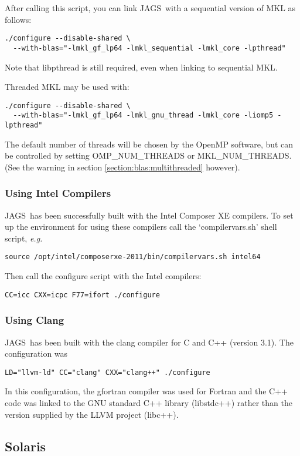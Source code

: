 \documentclass[11pt, a4paper, titlepage]{article}
\newcommand{\JAGS}{\textsf{JAGS}}
\newcommand{\code}[1]{{\bgroup{\normalfont\ttfamily #1}\egroup}}
\newcommand{\file}[1]{{`\normalfont\textsf{#1}'}}
\begin{document}
After calling this script, you can link \JAGS\ with a sequential
version of MKL as follows:
\begin{verbatim}
./configure --disable-shared \
  --with-blas="-lmkl_gf_lp64 -lmkl_sequential -lmkl_core -lpthread"
\end{verbatim}
Note that \code{libpthread} is still required, even when linking
to sequential MKL.

Threaded MKL may be used with:
\begin{verbatim}
./configure --disable-shared \
  --with-blas="-lmkl_gf_lp64 -lmkl_gnu_thread -lmkl_core -liomp5 -lpthread"
\end{verbatim}
The default number of threads will be chosen by the OpenMP software,
but can be controlled by setting \code{OMP\_NUM\_THREADS} or
\code{MKL\_NUM\_THREADS}.  (See the warning in section
\ref{section:blas:multithreaded} however).

\subsubsection{Using Intel Compilers}

\JAGS\ has been successfully built with the Intel Composer XE
compilers. To set up the environment for using these compilers call
the \file{compilervars.sh} shell script, {\em e.g.}
\begin{verbatim}
source /opt/intel/composerxe-2011/bin/compilervars.sh intel64
\end{verbatim}
Then call the configure script with the Intel compilers:
\begin{verbatim}
CC=icc CXX=icpc F77=ifort ./configure 
\end{verbatim}

\subsubsection{Using Clang}

\JAGS\ has been built with the clang compiler for C and C++ (version 3.1).
The configuration was
\begin{verbatim}
LD="llvm-ld" CC="clang" CXX="clang++" ./configure
\end{verbatim}
In this configuration, the gfortran compiler was used for Fortran and
the C++ code was linked to the GNU standard C++ library (libstdc++)
rather than the version supplied by the LLVM project (libc++).

\subsection{Solaris}
\end{document}
